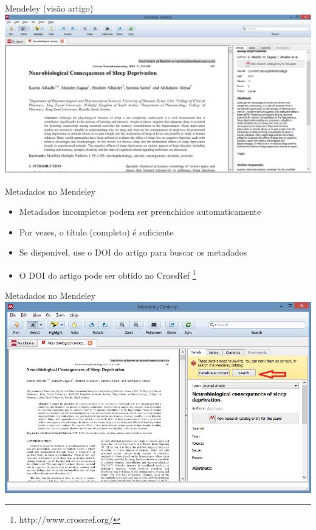 \documentclass{beamer}
\begin{document}
\begin{frame}{Mendeley (visão artigo)}
  \centering
  \includegraphics[width=1.2\textwidth]{Referencias/mendeley-artigo}
\end{frame}

\begin{frame}{Metadados no Mendeley}
  \begin{itemize}
    \footnotesize
  \item Metadados incompletos podem ser preenchidos automaticamente
  \item Por vezes, o título (completo) é suficiente
  \item Se disponível, use o DOI do artigo para buscar os metadados
  \item O DOI do artigo pode ser obtido no CrossRef
    \footnote{http://www.crossref.org/}
  \end{itemize}
\end{frame}

\begin{frame}{Metadados no Mendeley}
  \centering
  \includegraphics[width=\textwidth]{Referencias/mendeley-busca1}
\end{frame}
\end{document}
